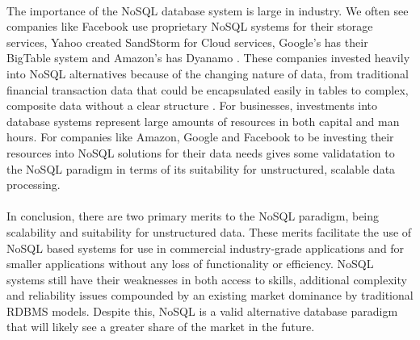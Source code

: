 \documentclass[12pt]{article}
\begin{document}
\paragraph{}
The importance of the NoSQL database system is large in industry. We often see companies like Facebook use proprietary NoSQL systems for their storage services, Yahoo created SandStorm for Cloud services, Google's has their BigTable system and Amazon's has Dyanamo \cite{chandra15}. These companies invested heavily into NoSQL alternatives because of the changing nature of data, from traditional financial transaction data that could be encapsulated easily in tables to complex, composite data without a clear structure \cite{hossain13}. For businesses, investments into database systems represent large amounts of resources in both capital and man hours. For companies like Amazon, Google and Facebook to be investing their resources into NoSQL solutions for their data needs gives some validatation to the NoSQL paradigm in terms of its suitability for unstructured, scalable data processing.
\paragraph{}
In conclusion, there are two primary merits to the NoSQL paradigm, being scalability and suitability for unstructured data. These merits facilitate the use of NoSQL based systems for use in commercial industry-grade applications and for smaller applications without any loss of functionality or efficiency. NoSQL systems still have their weaknesses in both access to skills, additional complexity and reliability issues compounded by an existing market dominance by traditional RDBMS models. Despite this, NoSQL is a valid alternative database paradigm that will likely see a greater share of the market in the future.



\end{document}
